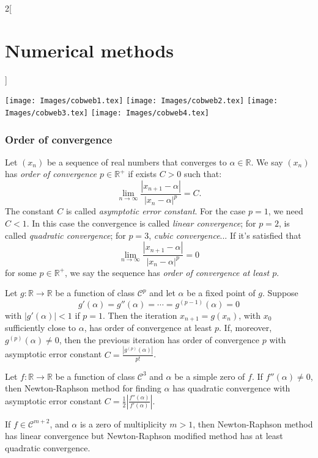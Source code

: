\documentclass[../../../main.tex]{subfiles}
\begin{document}
\begin{multicols}{2}[\section{Numerical methods}]
\begin{center}
    \texttt{[image: Images/cobweb1.tex]}
    \texttt{[image: Images/cobweb2.tex]}
    \texttt{[image: Images/cobweb3.tex]}
    \texttt{[image: Images/cobweb4.tex]}
\end{center}
\subsubsection*{Order of convergence}
\begin{definition}
Let $(x_n)$ be a sequence of real numbers that converges to $\alpha\in\mathbb{R}$. We say $(x_n)$ has \textit{order of convergence $p\in\mathbb{R}^+$} if exists $C>0$ such that: $$\lim_{n\to\infty}\frac{|x_{n+1}-\alpha|}{|x_n-\alpha|^p}=C.$$ The constant $C$ is called \textit{asymptotic error constant}. For the case $p=1$, we need $C<1$. In this case the convergence is called \textit{linear convergence}; for $p=2$, is called \textit{quadratic convergence}; for $p=3$, \textit{cubic convergence}... If it's satisfied that $$\lim_{n\to\infty}\frac{|x_{n+1}-\alpha|}{|x_n-\alpha|^p}=0$$ for some $p\in\mathbb{R}^+$, we say the sequence has \textit{order of convergence at least $p$}.
\end{definition}
\begin{theorem}
Let $g:\mathbb{R}\rightarrow\mathbb{R}$ be a function of class $\mathcal{C}^p$ and let $\alpha$ be a fixed point of $g$. Suppose $$g'(\alpha)=g''(\alpha)=\cdots=g^{(p-1)}(\alpha)=0$$ with $|g'(\alpha)|<1$ if $p=1$. Then the iteration $x_{n+1}=g(x_n)$, with $x_0$ sufficiently close to $\alpha$, has order of convergence at least $p$. If, moreover, $g^{(p)}(\alpha)\ne0$, then the previous iteration has order of convergence $p$ with asymptotic error constant $C=\frac{|g^{(p)}(\alpha)|}{p!}$.
\end{theorem}
\begin{theorem}
Let $f:\mathbb{R}\rightarrow\mathbb{R}$ be a function of class $\mathcal{C}^3$ and $\alpha$ be a simple zero of $f$. If $f''(\alpha)\ne0$, then Newton-Raphson method for finding $\alpha$ has quadratic convergence with asymptotic error constant $C=\frac{1}{2}\left|\frac{f''(\alpha)}{f'(\alpha)}\right|$.\par If $f\in\mathcal{C}^{m+2}$, and $\alpha$ is a zero of multiplicity $m>1$, then Newton-Raphson method has linear convergence but Newton-Raphson modified method has at least quadratic convergence.

\end{theorem}
\end{multicols}
\end{document}
